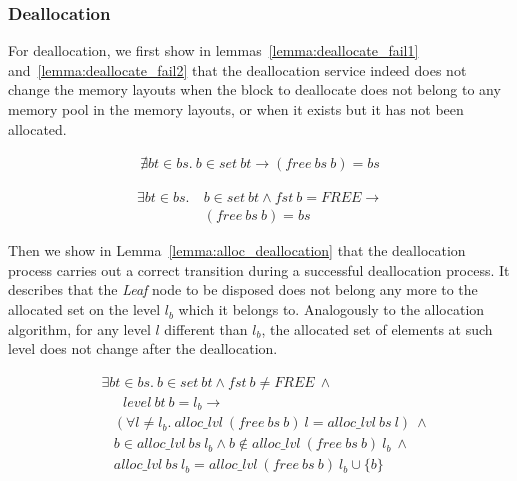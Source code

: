 \subsubsection{Deallocation}\label{sec:functionalDealloc}
For deallocation, we first show in lemmas~\ref{lemma:deallocate_fail1} and~\ref{lemma:deallocate_fail2} that the deallocation service indeed does not change the memory layouts when the block to deallocate does not belong to any memory pool in the memory layouts, or when it exists but it has not been allocated.

\begin{lemma} 
\label{lemma:deallocate_fail1}
\begin{align*}
\nexists bt \in bs.\ b \in set\ bt \longrightarrow (free\ bs\ b) = bs
\end{align*}
\end{lemma}
	
\begin{lemma} 
\label{lemma:deallocate_fail2}
\begin{align*}
\exists bt \in bs.\ &b\in set\ bt \wedge fst\ b = FREE \longrightarrow \\ 
&(free\ bs\ b) = bs
\end{align*}
\end{lemma}

Then we show in Lemma~\ref{lemma:alloc_deallocation} that the deallocation process carries out a correct transition during a successful deallocation process. It describes that the \emph{Leaf} node to be disposed does not belong any more to the allocated set on the level $l_b$ which it belongs to. Analogously to the allocation algorithm, for any level $l$ different than $l_b$, the allocated set of elements at such level does not change after the deallocation.

\begin{lemma} 
\label{lemma:alloc_deallocation}
\end{lemma}
\vspace{-7pt}
\begin{align*}
&\exists bt \in bs.\ b \in set\ bt \wedge fst\ b \neq FREE\ \wedge\\
&\ \ \ \ \ \ \ level\ bt\ b = l_b \longrightarrow\\
&\ \ \ \ (\forall l \ne l_b.\ alloc\_lvl\ (free\ bs\ b)\ l = alloc\_lvl\ bs\ l)\ \wedge\\
&\ \ \ \ b \in alloc \_lvl\ bs\ l_b \wedge b \notin alloc\_lvl\ (free\ bs\ b)\ l_b\ \wedge\\
&\ \ \ \ alloc\_lvl\ bs\ l_b = alloc\_lvl\ (free\ bs\ b)\ l_b \cup \lbrace b \rbrace
\end{align*}
\vspace{-12pt}

